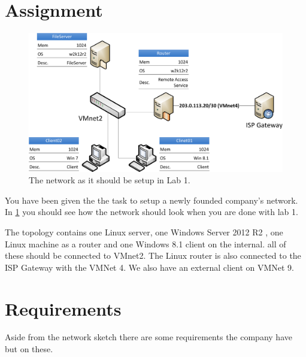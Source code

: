 \documentclass[paper=a4, fontsize=11pt]{report} %
\begin{document}
\section{Assignment}
\begin{figure}[h]
\centering
\includegraphics[width=1\linewidth]{./network}
\caption[Figure over network in Lab 1]{The network as it should be setup in Lab 1.}
\label{fig:network}
\end{figure}

You have been given the the task to setup a newly founded company's network. In \figurename \ref{fig:network} you should see how the network should look when you are done with lab 1.

The topology contains one Linux server, one Windows Server 2012 R2 , one Linux machine as a router and one Windows 8.1 client on the internal. all of these should be connected to VMnet2. The Linux router is also connected to the ISP Gateway with the VMNet 4.
We also have an external client on VMNet 9.

\section{Requirements}
\label{tasks}
Aside from the network sketch there are some requirements the company have but on these.
\end{document}
